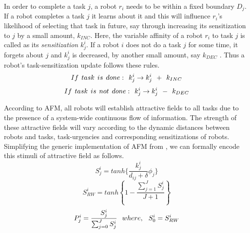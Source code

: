 \documentclass[final,5p,times,twocolumn]{elsarticle}
\begin{document}
In order to complete a task $j$, a robot $r_i$ needs to be within a fixed boundary $D_{j}$. If a robot completes a task $j$ it learns about it and this will influence $r_i$'s likelihood of selecting that task in future, say through increasing  its sensitization to $j$ by a small amount, $k_{INC}$. Here, the variable affinity of a robot $r_i$ to task $j$ is called as its {\em sensitization} $k^{i}_{j}$. If a robot $i$ does not do a task $j$ for some time, it forgets about $j$ and $k^i_j$ is decreased, by another small amount, say $k_{DEC}$ .
Thus a robot's task-sensitization update follows these rules.
\begin{equation}
 If\hspace*{0.15cm}task\hspace*{0.15cm}is\hspace*{0.15cm}done:\hspace*{0.15cm}  k^i_j \rightarrow   k^i_j \hspace*{0.15cm} + \hspace*{0.15cm} k_{INC}
\label{eqn:k-inc}
\end{equation}
\begin{equation}
 If\hspace*{0.15cm}task\hspace*{0.15cm}is\hspace*{0.15cm}not\hspace*{0.15cm}done:\hspace*{0.15cm}  k^i_j \rightarrow   k^i_j \hspace*{0.15cm} - \hspace*{0.15cm} k_{DEC}
\label{eqn:k-dec}
\end{equation}

According to AFM, all robots will establish attractive fields to all tasks due to the presence of a system-wide continuous flow of information. The strength of these attractive fields will vary according to the dynamic distances between robots and tasks, task-urgencies and corresponding sensitizations of robots. Simplifying the generic implementation of AFM from \citet{Arcaute+2008}, we can formally encode this stimuli of attractive field as follows.
\begin{equation}
S_{j}^{i} = tanh\{\frac{k_{j}^{i}}{d_{ij}+\delta } \phi _{j}\}
\label{eqn:afm1}
\end{equation}
\begin{equation}
S^{i}_{RW} = tanh \left \{ 1 -  \frac{ \sum_{j=1}^{J} S^{i}_{j}}{J + 1} \right \}
\label{eqn:afm2}
\end{equation}
\begin{equation}
P_{j}^{i} = \frac{S_{j}^{i}}{\sum_{j=0}^{J} S_{j}^{i}} \hspace*{0.25cm}where,\hspace*{0.25cm}S^{i}_{0} = S^{i}_{RW}   
\label{eqn:afm3}
\end{equation}
\end{document}
